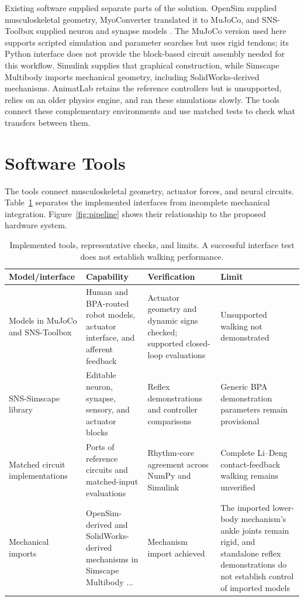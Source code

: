 Existing software supplied separate parts of the solution. OpenSim supplied musculoskeletal geometry, MyoConverter translated it to MuJoCo, and SNS-Toolbox supplied neuron and synapse models \citep{delp_opensim_2007, caggiano_myosuite_2022, todorov_mujoco_2012, nourse_sns_2023}. The MuJoCo version used here supports scripted simulation and parameter searches but uses rigid tendons; its Python interface does not provide the block-based circuit assembly needed for this workflow. Simulink supplies that graphical construction, while Simscape Multibody imports mechanical geometry, including SolidWorks-derived mechanisms. AnimatLab retains the reference controllers but is unsupported, relies on an older physics engine, and ran these simulations slowly. The tools connect these complementary environments and use matched tests to check what transfers between them.

\section{Software Tools}\label{sec:preliminary_sim_methods}

The tools connect musculoskeletal geometry, actuator forces, and neural circuits. Table~\ref{tab:sns_capability} separates the implemented interfaces from incomplete mechanical integration. Figure~\ref{fig:pipeline} shows their relationship to the proposed hardware system.

\begin{table}[htbp]
\caption[Neuromechanical tools and verification scope]{Implemented tools, representative checks, and limits. A successful interface test does not establish walking performance.}
\label{tab:sns_capability}
\small
\begin{tabularx}{\textwidth}{@{}>{\raggedright\arraybackslash}p{}*{3}{>{\raggedright\arraybackslash}X}@{}}
\toprule
\textbf{Model/interface} & \textbf{Capability} & \textbf{Verification} & \textbf{Limit} \\
\midrule
Models in MuJoCo and SNS-Toolbox & Human and BPA-routed robot models, actuator interface, and afferent feedback & Actuator geometry and dynamic signs checked; supported closed-loop evaluations & Unsupported walking not demonstrated \\
SNS-Simscape library & Editable neuron, synapse, sensory, and actuator blocks & Reflex demonstrations and controller comparisons & Generic BPA demonstration parameters remain provisional \\
Matched circuit implementations & Ports of reference circuits and matched-input evaluations & Rhythm-core agreement across NumPy and Simulink & Complete Li--Deng contact-feedback walking remains unverified \\
Mechanical imports & OpenSim-derived and SolidWorks-derived mechanisms in Simscape Multibody ...& Mechanism import achieved & The imported lower-body mechanism's ankle joints remain rigid, and standalone reflex demonstrations do not establish control of imported models  \\
\bottomrule
\end{tabularx}
\end{table}

